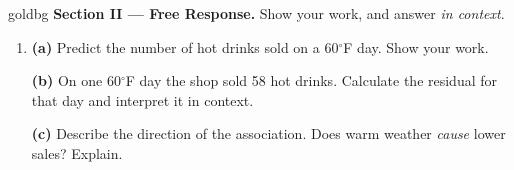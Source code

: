 \documentclass[12pt]{article}
\begin{document}
\boxguard[22]
\begin{headlinebox}{goldbg}
\small
\textbf{Section II --- Free Response.} Show your work, and answer \emph{in context}.
\end{headlinebox}

\begin{enumerate}[leftmargin=1.9em, itemsep=0.1in, resume]

  \boxguard[14]
  \item \textbf{(a)} Predict the number of hot drinks sold on a 60$^\circ$F day. Show your
        work.\\[4pt]

        \vspace{4pt}
        \boxguard[14]
        \textbf{(b)} On one 60$^\circ$F day the shop sold 58 hot drinks. Calculate the residual
        for that day and interpret it in context.\\[4pt]

        \vspace{4pt}
        \boxguard[14]
        \textbf{(c)} Describe the direction of the association. Does warm weather \emph{cause}
        lower sales? Explain.\\[4pt]

\end{enumerate}
\end{document}
